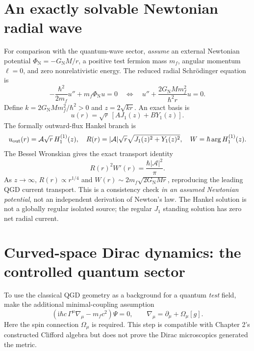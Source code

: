 \documentclass[11pt,a4paper,oneside]{report}
\numberwithin{equation}{chapter}
\theoremstyle{definition}\newtheorem{definition}[theorem]{Definition}
\theoremstyle{remark}\newtheorem{remark}[theorem]{Remark}
\newcommand{\ii}{\mathrm i}
\newcommand{\Phin}{\Phi_{\mathrm N}}
\newcommand{\GNewton}{G_{\mathrm N}}
\begin{document}
\section{An exactly solvable Newtonian radial wave}\label{sec:newtonwave}
For comparison with the quantum-wave sector, \emph{assume} an external Newtonian potential $\Phin=-\GNewton M/r$, a positive test fermion mass $m_f$, angular momentum $\ell=0$, and zero nonrelativistic energy. The reduced radial Schr\"odinger equation is
\begin{equation}
 -\frac{\hbar^2}{2m_f}u''+m_f\Phin u=0
 \quad\Longleftrightarrow\quad
 u''+\frac{2\GNewton Mm_f^2}{\hbar^2r}u=0.
 \label{eq:radialSch}
\end{equation}
Define $k=2\GNewton Mm_f^2/\hbar^2>0$ and $z=2\sqrt{kr}$. An exact basis is
\begin{equation}
 \boxed{\displaystyle u(r)=\sqrt r\,[A J_1(z)+B Y_1(z)].}
 \label{eq:Bessel}
\end{equation}
The formally outward-flux Hankel branch is
\begin{equation}
 u_{\rm out}(r)=\mathcal A\sqrt r\,H_1^{(1)}(z),
 \quad R(r)=|\mathcal A|\sqrt r\sqrt{J_1(z)^2+Y_1(z)^2},
 \quad W=\hbar\arg H_1^{(1)}(z).
 \label{eq:Hankel}
\end{equation}
The Bessel Wronskian gives the exact transport identity
\begin{equation}
 \boxed{R(r)^2W'(r)=\frac{\hbar|\mathcal A|^2}{\pi}.}
 \label{eq:exactflux}
\end{equation}
As $z\to\infty$, $R(r)\propto r^{1/4}$ and $W(r)\sim 2m_f\sqrt{2\GNewton Mr}$, reproducing the leading QGD current transport. This is a consistency check \emph{in an assumed Newtonian potential}, not an independent derivation of Newton's law. The Hankel solution is not a globally regular isolated source; the regular $J_1$ standing solution has zero net radial current.

\section{Curved-space Dirac dynamics: the controlled quantum sector}\label{sec:curvedDirac}
To use the classical QGD geometry as a background for a quantum \emph{test} field, make the additional minimal-coupling assumption
\begin{equation}
 (\ii\hbar c\,\Gamma^\mu\nabla_\mu-m_fc^2)\Psi=0,
 \qquad\nabla_\mu=\partial_\mu+\Omega_\mu[g].
 \label{eq:curvedDirac}
\end{equation}
Here the spin connection $\Omega_\mu$ is required. This step is compatible with Chapter 2's constructed Clifford algebra but does not prove the Dirac microscopics generated the metric.
\end{document}
